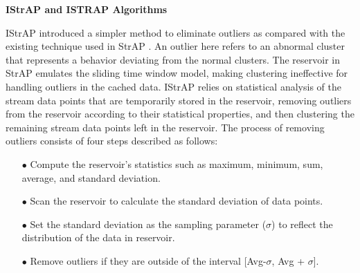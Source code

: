 


\vspace{7mm}
\hspace{-1 cm}
\textbf{IStrAP and ISTRAP Algorithms}

IStrAP introduced a simpler method to eliminate outliers as compared with the existing technique used in StrAP \cite{li2012improved}. An outlier here refers to an abnormal cluster that represents a behavior deviating from the normal clusters. The reservoir in StrAP emulates the sliding time window model, making clustering ineffective for handling outliers in the cached data. IStrAP relies on statistical analysis of the stream data points that are temporarily stored in the reservoir, removing outliers from the reservoir according to their statistical properties, and then clustering the remaining stream data points left in the reservoir. The process of removing outliers consists of four steps described as follows:





\begin{itemize}
    \item[$\bullet$]  Compute the reservoir's statistics such as maximum, minimum, sum, average, and standard deviation.
    \item[$\bullet$] Scan the reservoir to calculate the standard deviation of data points.
    \item[$\bullet$]  Set the standard deviation as the sampling parameter ($\sigma$) to reflect the distribution of the data in reservoir.
    \item[$\bullet$] Remove outliers if they are outside of the interval [Avg-$\sigma$, Avg + $\sigma$].
\end{itemize}

